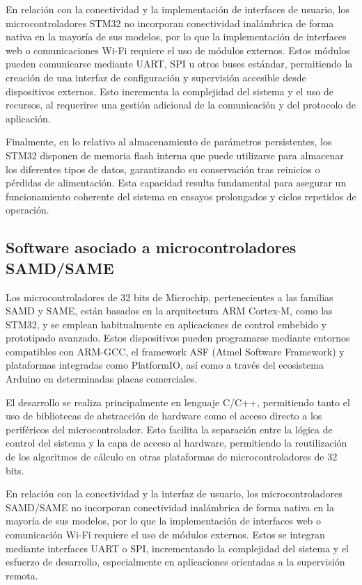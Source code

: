 En relación con la conectividad y la implementación de interfaces de usuario, los microcontroladores STM32 no incorporan conectividad inalámbrica de forma nativa en la mayoría de sus modelos, por lo que la implementación de interfaces web o comunicaciones Wi-Fi requiere el uso de módulos externos. Estos módulos pueden comunicarse mediante UART, SPI u otros buses estándar, permitiendo la creación de una interfaz de configuración y supervisión accesible desde dispositivos externos. Esto incrementa la complejidad del sistema y el uso de recursos, al requerirse una gestión adicional de la comunicación y del protocolo de aplicación.

Finalmente, en lo relativo al almacenamiento de parámetros persistentes, los STM32 disponen de memoria flash interna que puede utilizarse para almacenar los diferentes tipos de datos, garantizando su conservación tras reinicios o pérdidas de alimentación. Esta capacidad resulta fundamental para asegurar un funcionamiento coherente del sistema en ensayos prolongados y ciclos repetidos de operación.

\subsection{Software asociado a microcontroladores SAMD/SAME}

Los microcontroladores de 32 bits de Microchip, pertenecientes a las familias SAMD y SAME, están basados en la arquitectura ARM Cortex-M, como las STM32, y se emplean habitualmente en aplicaciones de control embebido y prototipado avanzado. Estos dispositivos pueden programarse mediante entornos compatibles con ARM-GCC, el framework ASF (Atmel Software Framework) y plataformas integradas como PlatformIO, así como a través del ecosistema Arduino en determinadas placas comerciales.

El desarrollo se realiza principalmente en lenguaje C/C++, permitiendo tanto el uso de bibliotecas de abstracción de hardware como el acceso directo a los periféricos del microcontrolador. Esto facilita la separación entre la lógica de control del sistema y la capa de acceso al hardware, permitiendo la reutilización de los algoritmos de cálculo en otras plataformas de microcontroladores de 32 bits.

En relación con la conectividad y la interfaz de usuario, los microcontroladores SAMD/SAME no incorporan conectividad inalámbrica de forma nativa en la mayoría de sus modelos, por lo que la implementación de interfaces web o comunicación Wi-Fi requiere el uso de módulos externos. Estos se integran mediante interfaces UART o SPI, incrementando la complejidad del sistema y el esfuerzo de desarrollo, especialmente en aplicaciones orientadas a la supervisión remota.

